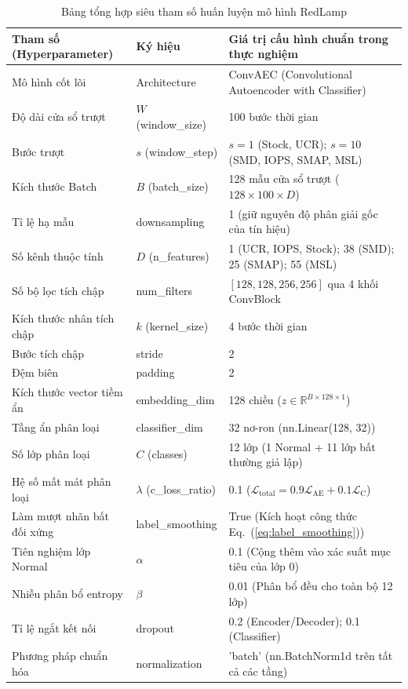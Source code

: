 \documentclass[11pt,journal,onecolumn]{IEEEtran}
\begin{document}
\begin{table}[htbp]
\centering
\caption{Bảng tổng hợp siêu tham số huấn luyện mô hình RedLamp}
\label{tab:hyperparameters}
\begin{tabular}{llp{7.0cm}}
\toprule
\textbf{Tham số (Hyperparameter)} & \textbf{Ký hiệu} & \textbf{Giá trị cấu hình chuẩn trong thực nghiệm} \\
\midrule
Mô hình cốt lõi & Architecture & ConvAEC (Convolutional Autoencoder with Classifier) \\
Độ dài cửa sổ trượt & $W$ (window\_size) & 100 bước thời gian \\
Bước trượt & $s$ (window\_step) & $s=1$ (Stock, UCR); $s=10$ (SMD, IOPS, SMAP, MSL) \\
Kích thước Batch & $B$ (batch\_size) & 128 mẫu cửa sổ trượt ($128 \times 100 \times D$) \\
Tỉ lệ hạ mẫu & downsampling & 1 (giữ nguyên độ phân giải gốc của tín hiệu) \\
Số kênh thuộc tính & $D$ (n\_features) & 1 (UCR, IOPS, Stock); 38 (SMD); 25 (SMAP); 55 (MSL) \\
Số bộ lọc tích chập & num\_filters & $[128, 128, 256, 256]$ qua 4 khối ConvBlock \\
Kích thước nhân tích chập & $k$ (kernel\_size) & 4 bước thời gian \\
Bước tích chập & stride & 2 \\
Đệm biên & padding & 2 \\
Kích thước vector tiềm ẩn & embedding\_dim & 128 chiều ($z \in \mathbb{R}^{B \times 128 \times 1}$) \\
Tầng ẩn phân loại & classifier\_dim & 32 nơ-ron (nn.Linear(128, 32)) \\
Số lớp phân loại & $C$ (classes) & 12 lớp (1 Normal + 11 lớp bất thường giả lập) \\
Hệ số mất mát phân loại & $\lambda$ (c\_loss\_ratio) & 0.1 ($\mathcal{L}_{\text{total}} = 0.9\mathcal{L}_{\text{AE}} + 0.1\mathcal{L}_{\text{C}}$) \\
Làm mượt nhãn bất đối xứng & label\_smoothing & True (Kích hoạt công thức Eq.~(\ref{eq:label_smoothing})) \\
Tiên nghiệm lớp Normal & $\alpha$ & 0.1 (Cộng thêm vào xác suất mục tiêu của lớp 0) \\
Nhiễu phân bổ entropy & $\beta$ & 0.01 (Phân bổ đều cho toàn bộ 12 lớp) \\
Tỉ lệ ngắt kết nối & dropout & 0.2 (Encoder/Decoder); 0.1 (Classifier) \\
Phương pháp chuẩn hóa & normalization & 'batch' (nn.BatchNorm1d trên tất cả các tầng) \\

\end{tabular}
\end{table}
\end{document}
